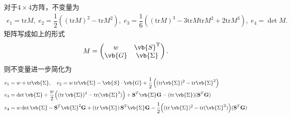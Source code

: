 对于\(4\times4\)方阵，不变量为
\begin{align*}
	e_1 = \mathrm{tr}M,\;e_2 = \dfrac{1}{2}\left( (\mathrm{tr}M)^2 - \mathrm{tr}M^2 \right),\;e_3 = \dfrac{1}{6}\left( (\mathrm{tr}M)^3 - 3 \mathrm{tr}M \mathrm{tr}M^2 + 2 \mathrm{tr}M^3 \right),\;e_4 = \det M.
\end{align*}
矩阵写成如上的形式
\begin{align*}
	M=\begin{pmatrix}
		w      & \vb{S}^\mathrm{T} \\
		\vb{G} & \vb{\Sigma}
	\end{pmatrix}.
\end{align*}
则不变量进一步简化为
\begin{align*}
	e_1 &= w + \mathrm{tr}\vb{\Sigma}, \quad e_2 = w \, \mathrm{tr}\vb{\Sigma} - \vb{S} \cdot \vb{G} + \dfrac{1}{2}\left( (\mathrm{tr}\vb{\Sigma})^2 - \mathrm{tr}\vb{\Sigma}^2 \right)\\
	e_3&=\det\vb{\Sigma}+\frac{w}{2}\Big((\operatorname{tr}\vb{\Sigma})^2-\operatorname{tr}(\vb{\Sigma}^2)\Big)
	+\mathbf{S}^{T}\vb{\Sigma}\mathbf{G}-(\operatorname{tr}\vb{\Sigma})(\mathbf{S}^{T}\mathbf{G})\\
	e_4&=w\det\vb{\Sigma}-\mathbf{S}^{T}\vb{\Sigma}^{2}\mathbf{G}
	+(\operatorname{tr}\vb{\Sigma})\,\mathbf{S}^{T}\vb{\Sigma}\mathbf{G}
	-\frac{1}{2}\Big((\operatorname{tr}\vb{\Sigma})^2-\operatorname{tr}(\vb{\Sigma}^2)\Big)(\mathbf{S}^{T}\mathbf{G})
\end{align*}

